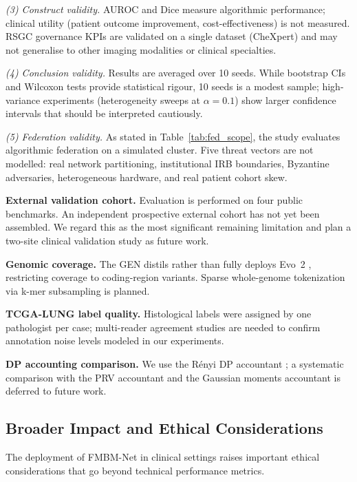 \documentclass{ieeeaccess}
\begin{document}
\noindent\textit{(3) Construct validity.}
AUROC and Dice measure algorithmic performance; clinical utility
(patient outcome improvement, cost-effectiveness) is not measured.
RSGC governance KPIs are validated on a single dataset (CheXpert) and
may not generalise to other imaging modalities or clinical specialties.

\noindent\textit{(4) Conclusion validity.}
Results are averaged over 10 seeds. While bootstrap CIs and Wilcoxon tests
provide statistical rigour, 10 seeds is a modest sample; high-variance
experiments (heterogeneity sweeps at $\alpha\!=\!0.1$) show larger
confidence intervals that should be interpreted cautiously.

\noindent\textit{(5) Federation validity.}
As stated in Table~\ref{tab:fed_scope}, the study evaluates algorithmic
federation on a simulated cluster. Five threat vectors are not modelled:
real network partitioning, institutional IRB boundaries, Byzantine
adversaries, heterogeneous hardware, and real patient cohort skew.

\textbf{External validation cohort.} Evaluation is performed on four public
benchmarks. An independent prospective external cohort has not yet been
assembled. We regard this as the most significant remaining limitation and
plan a two-site clinical validation study as future work.

\textbf{Genomic coverage.} The GEN distils rather than fully deploys
Evo~2 \cite{evo2_2026}, restricting coverage to coding-region variants.
Sparse whole-genome tokenization via k-mer subsampling is planned.

\textbf{TCGA-LUNG label quality.} Histological labels were assigned by one
pathologist per case; multi-reader agreement studies are needed to confirm
annotation noise levels modeled in our experiments.

\textbf{DP accounting comparison.} We use the R\'{e}nyi DP
accountant \cite{mironov2017renyi}; a systematic comparison with the PRV
accountant \cite{gopi2021prv} and the Gaussian moments accountant is deferred
to future work.



\subsection{Broader Impact and Ethical Considerations}

The deployment of FMBM-Net in clinical settings raises important ethical
considerations that go beyond technical performance metrics.
\end{document}
